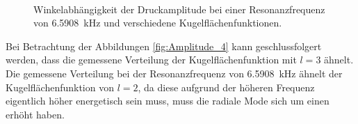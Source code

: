\begin{figure}
    \\
    \caption{Winkelabhängigkeit der Druckamplitude bei einer Resonanzfrequenz von \SI{6.5908}{\kilo\hertz} und verschiedene Kugelflächenfunktionen.}
    \label{fig:Amplitude_6}
\end{figure}
\FloatBarrier
Bei Betrachtung der Abbildungen \ref{fig:Amplitude_4} kann geschlussfolgert werden, 
dass die gemessene Verteilung der Kugelflächenfunktion mit $l=3$ ähnelt. \\
Die gemessene Verteilung bei der Resonanzfrequenz von \SI{6.5908}{\kilo\hertz} ähnelt der Kugelflächenfunktion von $l=2$, da
diese aufgrund der höheren Frequenz eigentlich höher energetisch sein muss, muss die radiale Mode sich um einen erhöht haben.


